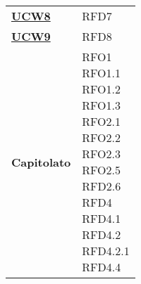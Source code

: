 \begin{longtable}[H]{| >{\centering\bfseries}p{8cm} | >{\centering\arraybackslash}p{8cm} |}
    \hyperref[sub:ucw8]{UCW8}          & RFD7                                                                      \\

    \hyperref[sub:ucw9]{UCW9}          & RFD8                                                                      \\

    Capitolato                       &
    \makecell{
        \rule{0pt}{4ex}
    RFO1                                                                                                         \\
    RFO1.1                                                                                                       \\
    RFO1.2                                                                                                       \\
    RFO1.3                                                                                                       \\
    RFO2.1                                                                                                       \\
    RFO2.2                                                                                                       \\
    RFO2.3                                                                                                       \\
    RFO2.5                                                                                                       \\
    RFD2.6                                                                                                       \\
    RFD4                                                                                                         \\
    RFD4.1                                                                                                       \\
    RFD4.2                                                                                                       \\
    RFD4.2.1                                                                                                     \\
    RFD4.4                                                                                                       \\
}
\end{longtable}
